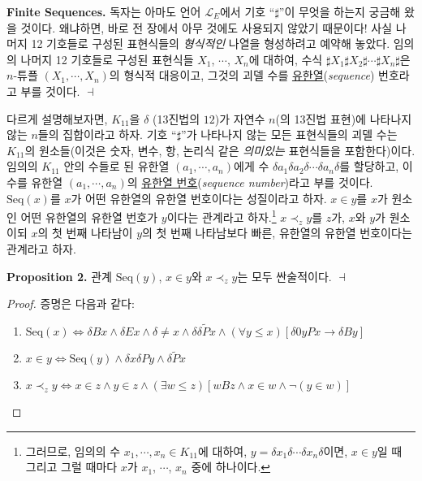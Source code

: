 \documentclass[12pt]{paper}
\newenvironment{context}[1][]
{ \noindent \textbf{{#1}.} }
{ \hfill $ \dashv $ }
\begin{document}
\begin{context}[Finite Sequences]
독자는 아마도 언어 $\mathcal{L}_{E}$에서 기호 ``$\sharp$''이 무엇을 하는지 궁금해 왔을 것이다.
왜냐하면, 바로 전 장에서 아무 것에도 사용되지 않았기 때문이다!
사실 나머지 12 기호들로 구성된 표현식들의 \textit{형식적인} 나열을 형성하려고 예약해 놓았다.
임의의 나머지 12 기호들로 구성된 표현식들 $X_1$, $\cdots$, $X_{n}$에 대하여,
수식 $ \sharp X_1 \sharp X_2 \sharp \cdots \sharp X_{n} \sharp $은
$n$-튜플 $\left( X_{1} , \cdots , X_{n} \right)$의 형식적 대응이고,
그것의 괴델 수를 \underline{유한열}(\textit{sequence}) 번호라고 부를 것이다.
\end{context}

다르게 설명해보자면, $K_{11}$을 $\delta$ (13진법의 $12$)가 자연수 $n$(의 13진법 표현)에 나타나지 않는 $n$들의 집합이라고 하자.
기호 ``$\sharp$''가 나타나지 않는 모든 표현식들의 괴델 수는 $K_{11}$의 원소들(이것은 숫자, 변수, 항, 논리식 같은 \textit{의미있는} 표현식들을 포함한다)이다.
임의의 $K_{11}$ 안의 수들로 된 유한열 $\left( a_{1} , \cdots , a_{n} \right)$에게 수 $\delta a_1 \delta a_2 \delta \cdots \delta a_n \delta$를 할당하고,
이 수를 유한열 $\left( a_{1} , \cdots , a_{n} \right)$의 \underline{유한열 번호}(\textit{sequence number})라고 부를 것이다.
$ \mathrm{Seq} \left( x \right) $를 $x$가 어떤 유한열의 유한열 번호이다는 성질이라고 하자.
$ x \in y $를 $x$가 원소인 어떤 유한열의 유한열 번호가 $y$이다는 관계라고 하자.\footnote
{
그러므로, 임의의 수 $x_{1}, \cdots, x_{n} \in K_{11}$에 대하여, $y = \delta x_1 \delta \cdots \delta x_{n} \delta$이면,
$x \in y$일 때 그리고 그럴 때마다 $x$가 $x_1$, $\cdots$, $x_n$ 중에 하나이다.
} $ x \prec_{z} y$를 $z$가, $x$와 $y$가 원소이되 $x$의 첫 번째 나타남이 $y$의 첫 번째 나타남보다 빠른, 유한열의 유한열 번호이다는 관계라고 하자.

\begin{context}[Proposition 2]
관계 $\mathrm{Seq} \left( y \right)$, $x \in y$와 $x \prec_{z} y$는 모두 싼술적이다.
\end{context}
\begin{proof}
증명은 다음과 같다:
\begin{enumerate}
\item $\mathrm{Seq} \left( x \right) \iff \delta B x \land \delta E x \land \delta \ne x \land \delta \delta \widetilde{P} x \land \left( \forall y \le x \right) \left[ \delta 0 y P x \rightarrow \delta B y \right]$
\item $x \in y \iff \mathrm{Seq} \left( y \right) \land \delta x \delta P y \land \delta \widetilde{P} x$
\item $x \prec_{z} y \iff x \in z \land y \in z \land \left( \exists w \le z \right) \left[ w B z \land x \in w \land \lnot \left( y \in w \right) \right]$
\end{enumerate}
\end{proof}
\end{document}
